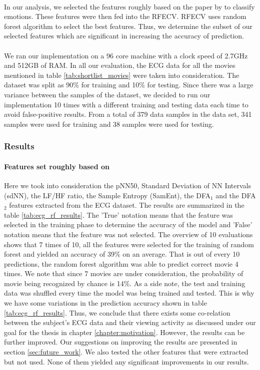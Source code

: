 \paragraph{} In our analysis, we selected the features roughly based on the paper by \citeauthor{zhao_emotion_2016} to classify emotions. These features were then fed into the RFECV. RFECV uses random forest algorithm to select the best features. Thus, we determine the subset of our selected features which are significant in increasing the accuracy of prediction.

\paragraph{} We ran our implementation on a 96 core machine with a clock speed of 2.7GHz and 512GB of RAM. In all our evaluation, the ECG data for all the movies mentioned in table \ref{tab:shortlist_movies} were taken into consideration. The dataset was split as 90\% for training and 10\% for testing. Since there was a large variance between the samples of the dataset, we decided to run our implementation 10 times with a different training and testing data each time to avoid false-positive results. From a total of 379 data samples in the data set, 341 samples were used for training and 38 samples were used for testing. 

\subsubsection{Results}
\label{sec:ecg_analysis_results}
\paragraph{Features set roughly based on \citeauthor{zhao_emotion_2016}} Here we took into consideration the pNN50, Standard Deviation of NN Intervals (sdNN), the LF/HF ratio, the Sample Entropy (SamEnt), the DFA$_{1}$ and the DFA$_{2}$ features extracted from the ECG dataset. The results are summarized in the table \ref{tab:ecg_rf_results}. The 'True' notation means that the feature was selected in the training phase to determine the accuracy of the model and 'False' notation means that the feature was not selected. The overview of 10 evaluations shows that 7 times of 10, all the features were selected for the training of random forest and yielded an accuracy of 39\% on an average. That is out of every 10 predictions, the random forest algorithm was able to predict correct movie 4 times. We note that since 7 movies are under consideration, the probability of movie being recognized by chance is 14\%. As a side note, the test and training data was shuffled every time the model was being trained and tested. This is why we have some variations in the prediction accuracy shown in table \ref{tab:ecg_rf_results}. Thus, we conclude that there exists some co-relation between the subject's ECG data and their viewing activity as discussed under our goal for the thesis in chapter \ref{chapter:motivation}. However, the results can be further improved. Our suggestions on improving the results are presented in section \ref{sec:future_work}. We also tested the other features that were extracted but not used. None of them yielded any significant improvements in our results.


